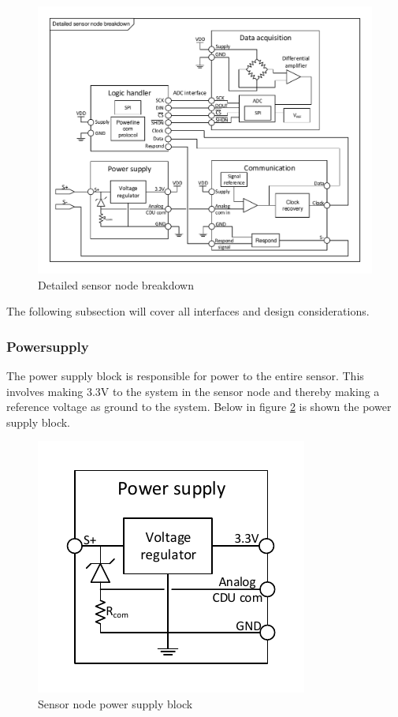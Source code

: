 \begin{figure}[H]
	\centering
	\includegraphics[width=1\textwidth]{billeder/SN_detailed_design}
	\caption{Detailed sensor node breakdown}
	\label{fig:SN_detailed}
\end{figure}

The following subsection will cover all interfaces and design considerations.

\subsubsection{Powersupply}
The power supply block is responsible for power to the entire sensor. This involves making 3.3V to the system in the sensor node and thereby making a reference voltage as ground to the system. Below in figure \ref{fig:SN_PS_FIGURE} is shown the power supply block.

\begin{figure}[H]
	\centering
	\includegraphics[width=.5\textwidth]{billeder/powersupply_detailed_sn}
	\caption{Sensor node power supply block}
	\label{fig:SN_PS_FIGURE}
\end{figure} 

